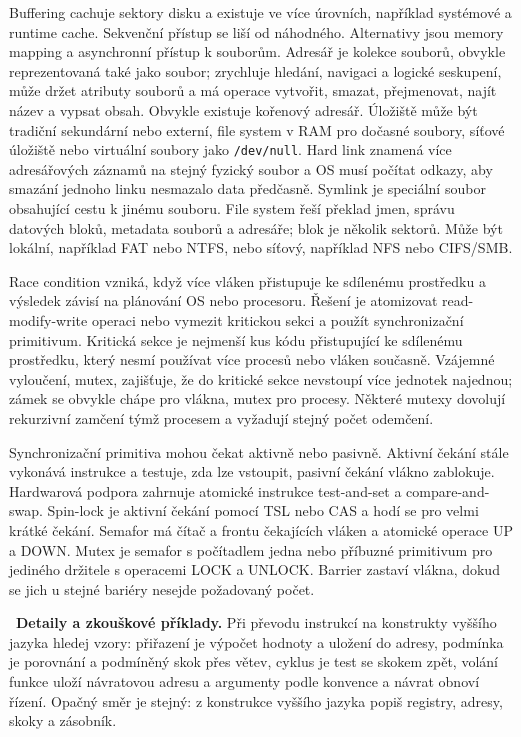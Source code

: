 \begin{odpoved}
Buffering cachuje sektory disku a existuje ve více úrovních, například systémové a
runtime cache. Sekvenční přístup se liší od náhodného. Alternativy jsou memory mapping a
asynchronní přístup k souborům. Adresář je kolekce souborů, obvykle reprezentovaná také
jako soubor; zrychluje hledání, navigaci a logické seskupení, může držet atributy souborů
a má operace vytvořit, smazat, přejmenovat, najít název a vypsat obsah. Obvykle existuje
kořenový adresář. Úložiště může být tradiční sekundární nebo externí, file system v RAM
pro dočasné soubory, síťové úložiště nebo virtuální soubory jako \texttt{/dev/null}.
Hard link znamená více adresářových záznamů na stejný fyzický soubor a OS musí počítat
odkazy, aby smazání jednoho linku nesmazalo data předčasně. Symlink je speciální soubor
obsahující cestu k jinému souboru. File system řeší překlad jmen, správu datových bloků,
metadata souborů a adresáře; blok je několik sektorů. Může být lokální, například FAT
nebo NTFS, nebo síťový, například NFS nebo CIFS/SMB.

Race condition vzniká, když více vláken přistupuje ke sdílenému prostředku a výsledek
závisí na plánování OS nebo procesoru. Řešení je atomizovat read-modify-write operaci
nebo vymezit kritickou sekci a použít synchronizační primitivum. Kritická sekce je
nejmenší kus kódu přistupující ke sdílenému prostředku, který nesmí používat více
procesů nebo vláken současně. Vzájemné vyloučení, mutex, zajišťuje, že do kritické sekce
nevstoupí více jednotek najednou; zámek se obvykle chápe pro vlákna, mutex pro procesy.
Některé mutexy dovolují rekurzivní zamčení týmž procesem a vyžadují stejný počet
odemčení.

Synchronizační primitiva mohou čekat aktivně nebo pasivně. Aktivní čekání stále vykonává
instrukce a testuje, zda lze vstoupit, pasivní čekání vlákno zablokuje. Hardwarová
podpora zahrnuje atomické instrukce test-and-set a compare-and-swap. Spin-lock je
aktivní čekání pomocí TSL nebo CAS a hodí se pro velmi krátké čekání. Semafor má čítač a
frontu čekajících vláken a atomické operace UP a DOWN. Mutex je semafor s počítadlem
jedna nebo příbuzné primitivum pro jediného držitele s operacemi LOCK a UNLOCK. Barrier
zastaví vlákna, dokud se jich u stejné bariéry nesejde požadovaný počet.

\noindent{}\ \textbf{Detaily a zkouškové příklady.}
Při převodu instrukcí na konstrukty vyššího jazyka hledej vzory: přiřazení je výpočet
hodnoty a uložení do adresy, podmínka je porovnání a podmíněný skok přes větev, cyklus je
test se skokem zpět, volání funkce uloží návratovou adresu a argumenty podle konvence a
návrat obnoví řízení. Opačný směr je stejný: z konstrukce vyššího jazyka popiš registry,
adresy, skoky a zásobník.


\end{odpoved}
